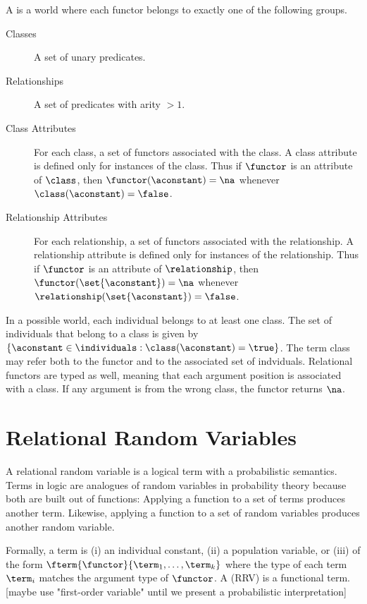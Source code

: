 \documentclass{article}
\begin{document}
A  is a world where each functor belongs to exactly one of the following groups.

\begin{description}
\item[Classes] A set of unary predicates. 
\item[Relationships] A set of predicates with arity $>1$.
\item[Class Attributes] For each class, a set of functors associated with the class. A class attribute is defined only for instances of the class. Thus if $\functor$ is an attribute of $\class$, then $\functor(\aconstant) = \na$ whenever $\class(\aconstant) = \false$.
\item[Relationship Attributes] For each relationship, a set of functors associated with the relationship. A relationship attribute is defined only for instances of the relationship. Thus if $\functor$ is an attribute of $\relationship$, then $\functor(\set{\aconstant}) = \na$ whenever $\relationship(\set{\aconstant}) = \false$.
\end{description}



In a possible world, each individual belongs to at least one class. The set of individuals that belong to a class is given by $\{\aconstant \in \individuals: \class(\aconstant)=\true \}$. 
The term class may refer both to the functor and to the associated set of indviduals. Relational functors are typed as well, meaning that each argument position is associated with a class. If any argument is from the wrong class, the functor returns $\na$. 


\section{Relational Random Variables} 

A relational random variable is a logical term with a probabilistic semantics. Terms in logic are analogues of random variables in probability theory because both are built out of functions: Applying a function to a set of terms produces another term. Likewise, applying a function to a set of random variables produces another random variable. 

Formally, a term is (i) an individual constant, (ii) a population variable, or (iii)  of the form $\fterm{\functor}{\term_{1},\ldots,\term_{k}}$ where the type of each term $\term_{i}$ matches the argument type of $\functor$. 
A  (RRV) is a functional term. [maybe use "first-order variable" until we present a probabilistic interpretation]
\end{document}
